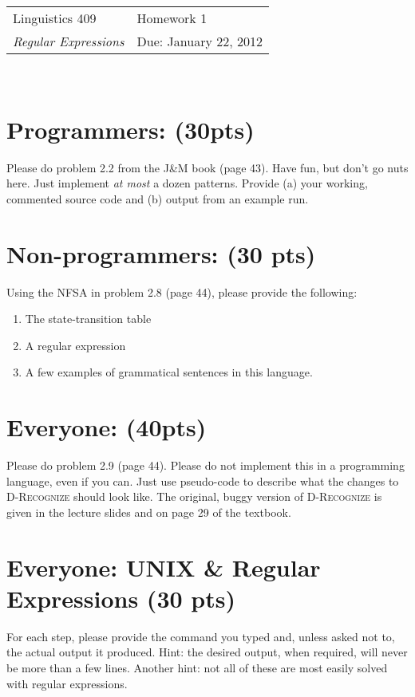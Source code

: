 \documentclass[11pt]{article}
\begin{document}
\noindent
\begin{tabularx}{\textwidth}{X>{\raggedleft}X}
       \noindent Linguistics 409 & Homework 1\tabularnewline
       \noindent \emph{Regular Expressions} & Due: January 22, 2012\\
\end{tabularx}\\

\section{Programmers: (30pts)} Please do problem 2.2 from the J\&M book (page 43).  Have fun, but don't go nuts here.  Just implement \emph{at most} a dozen patterns.  Provide (a) your working, commented source code and (b) output from an example run.

\setcounter{section}{0}
\section{Non-programmers: (30 pts)} Using the NFSA in problem 2.8 (page 44), please provide the following:

\begin{enumerate}
     \item The state-transition table
     \item A regular expression
     \item A few examples of grammatical sentences in this language.
\end{enumerate}

\section{Everyone: (40pts)} Please do problem 2.9 (page 44).  Please do not implement this in a programming language, even if you can.  Just use pseudo-code to describe what the changes to \textsc{D-Recognize} should look like.  The original, buggy version of \textsc{D-Recognize} is given in the lecture slides and on page 29 of the textbook.

\section{Everyone: UNIX \& Regular Expressions (30 pts)}
For each step, please provide the command you typed and, unless asked not to, the actual output it produced.  Hint:  the desired output, when required, will never be more than a few lines.  Another hint: not all of these are most easily solved with regular expressions.
\end{document}

